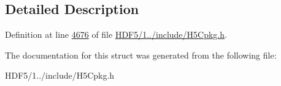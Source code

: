 \subsection{Detailed Description}


Definition at line \hyperlink{_h_d_f5_21_810_81_2include_2_h5_cpkg_8h_source_l04676}{4676} of file \hyperlink{_h_d_f5_21_810_81_2include_2_h5_cpkg_8h_source}{H\+D\+F5/1../include/\+H5\+Cpkg.\+h}.



The documentation for this struct was generated from the following file\+:\begin{DoxyCompactItemize}
\item 
H\+D\+F5/1../include/\+H5\+Cpkg.\+h\end{DoxyCompactItemize}
